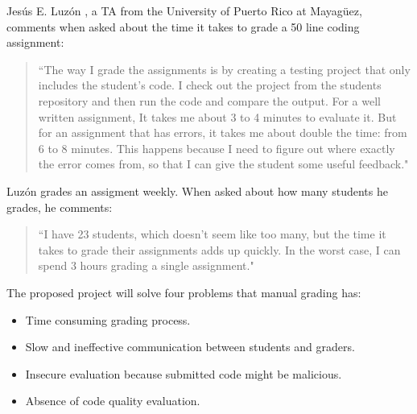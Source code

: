 Jesús E. Luzón \cite{Chiki}, a TA from the University of Puerto Rico at
Mayagüez, comments when asked about the time it takes to grade a 50 line coding
assignment: \begin{quote} ``The way I grade the assignments is by creating a
testing project that only includes the student's code. I check out the project
from the students repository and then run the code and compare the output. For a
well written assignment, It takes me about 3 to 4 minutes to evaluate it. But
for an assignment that has errors, it takes me about double the time: from 6 to
8 minutes. This happens because I need to figure out where exactly the error
comes from, so that I can give the student some useful feedback." \end{quote}
Luzón grades an assigment weekly. When asked about how many students he grades,
he comments: \begin{quote} ``I have 23 students, which doesn't seem like too
many, but the time it takes to grade their assignments adds up quickly. In the
worst case, I can spend 3 hours grading a single assignment." \end{quote}


The proposed project will solve four problems that manual grading has:
\begin{itemize}
\item Time consuming grading process.
\item Slow and ineffective communication between students and graders.
\item Insecure evaluation because submitted code might be malicious.
\item Absence of code quality evaluation.
\end{itemize}

